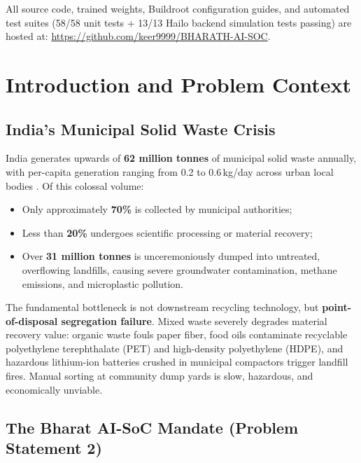 \documentclass[12pt,a4paper]{article}
\begin{document}
All source code, trained weights, Buildroot configuration guides, and automated test suites
(58/58 unit tests + 13/13 Hailo backend simulation tests passing) are hosted at:
\url{https://github.com/keer9999/BHARATH-AI-SOC}.

\clearpage

\section{Introduction and Problem Context}

\subsection{India's Municipal Solid Waste Crisis}

India generates upwards of \textbf{62 million tonnes} of municipal solid waste annually,
with per-capita generation ranging from 0.2 to 0.6\,kg/day across urban local bodies
\cite{mpcb2022, cpcb2020}. Of this colossal volume:
\begin{itemize}[noitemsep]
  \item Only approximately \textbf{70\%} is collected by municipal authorities;
  \item Less than \textbf{20\%} undergoes scientific processing or material recovery;
  \item Over \textbf{31 million tonnes} is unceremoniously dumped into untreated, overflowing
  landfills, causing severe groundwater contamination, methane emissions, and microplastic pollution.
\end{itemize}

The fundamental bottleneck is not downstream recycling technology, but \textbf{point-of-disposal
segregation failure}. Mixed waste severely degrades material recovery value: organic waste fouls
paper fiber, food oils contaminate recyclable polyethylene terephthalate (PET) and high-density
polyethylene (HDPE), and hazardous lithium-ion batteries crushed in municipal compactors trigger
landfill fires. Manual sorting at community dump yards is slow, hazardous, and economically
unviable.

\subsection{The Bharat AI-SoC Mandate (Problem Statement 2)}
\end{document}
